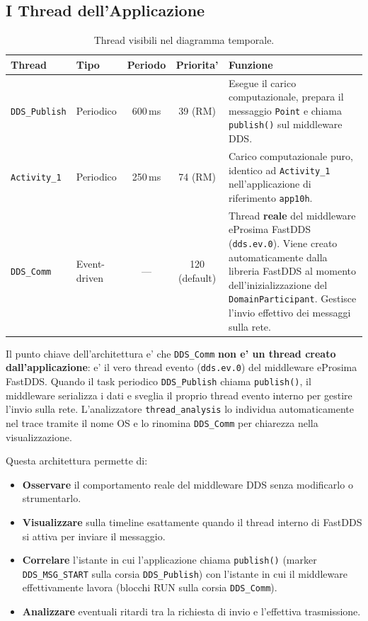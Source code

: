 \subsection{I Thread dell'Applicazione}
\label{subsec:thread}

\begin{table}[htbp]
\centering
\caption{Thread visibili nel diagramma temporale.}
\label{tab:thread}
\begin{tabular}{llccp{5.5cm}}
\toprule
\textbf{Thread} & \textbf{Tipo} & \textbf{Periodo} & \textbf{Priorita'} & \textbf{Funzione} \\
\midrule
\texttt{DDS\_Publish} & Periodico & 600\,ms & 39 (RM) &
    Esegue il carico computazionale, prepara il messaggio \texttt{Point}
    e chiama \texttt{publish()} sul middleware DDS. \\
\texttt{Activity\_1}  & Periodico & 250\,ms & 74 (RM) &
    Carico computazionale puro, identico ad \texttt{Activity\_1}
    nell'applicazione di riferimento \texttt{app10h}. \\
\midrule
\texttt{DDS\_Comm}    & Event-driven & --- & 120 (default) &
    Thread \textbf{reale} del middleware eProsima FastDDS
    (\texttt{dds.ev.0}). Viene creato automaticamente dalla libreria
    FastDDS al momento dell'inizializzazione del \texttt{DomainParticipant}.
    Gestisce l'invio effettivo dei messaggi sulla rete. \\
\bottomrule
\end{tabular}
\end{table}

Il punto chiave dell'architettura e' che \texttt{DDS\_Comm} \textbf{non e'
un thread creato dall'applicazione}: e' il vero thread evento
(\texttt{dds.ev.0}) del middleware eProsima FastDDS. Quando il task
periodico \texttt{DDS\_Publish} chiama \texttt{publish()}, il middleware
serializza i dati e sveglia il proprio thread evento interno per gestire
l'invio sulla rete. L'analizzatore \texttt{thread\_analysis} lo individua
automaticamente nel trace tramite il nome OS e lo rinomina
\texttt{DDS\_Comm} per chiarezza nella visualizzazione.

Questa architettura permette di:
\begin{itemize}
    \item \textbf{Osservare} il comportamento reale del middleware DDS
          senza modificarlo o strumentarlo.
    \item \textbf{Visualizzare} sulla timeline esattamente quando il
          thread interno di FastDDS si attiva per inviare il messaggio.
    \item \textbf{Correlare} l'istante in cui l'applicazione chiama
          \texttt{publish()} (marker \texttt{DDS\_MSG\_START} sulla corsia
          \texttt{DDS\_Publish}) con l'istante in cui il middleware
          effettivamente lavora (blocchi RUN sulla corsia \texttt{DDS\_Comm}).
    \item \textbf{Analizzare} eventuali ritardi tra la richiesta di invio
          e l'effettiva trasmissione.
\end{itemize}

